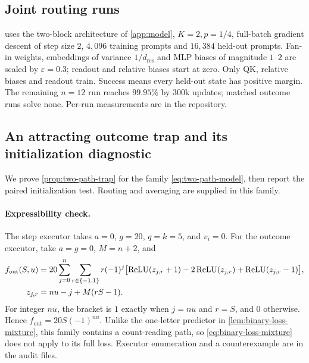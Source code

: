 \subsection{Joint routing runs}
\label{app:reach}

 uses the two-block architecture of \cref{app:model}, $K=2,p=1/4$,
full-batch gradient descent of step size $2$, $4{,}096$ training prompts and $16{,}384$
held-out prompts. Fan-in weights, embeddings of variance $1/d_{\mathrm{res}}$ and
MLP biases of magnitude $1$--$2$ are scaled by $\varepsilon=0.3$; readout and relative
biases start at zero. Only QK, relative biases and readout train. Success means every
held-out state has positive margin. The remaining $n=12$ run reaches $99.95\%$ by
$300$k updates; matched outcome runs solve none. Per-run measurements are in the repository.

\subsection{An attracting outcome trap and its initialization diagnostic}
\label{app:two-path}
We prove \cref{prop:two-path-trap} for the family \cref{eq:two-path-model}, then
report the paired initialization test. Routing and averaging are supplied in this family.

\paragraph{Expressibility check.}
The step executor takes $a=0$, $g=20$, $q=k=5$, and $v_i=0$.
For the outcome executor, take $a=g=0$, $M=n+2$, and
\[
\begin{aligned}
 f_{\mathrm{out}}(S,u)&=20\sum_{j=0}^n\sum_{r\in\{-1,1\}}r(-1)^j
 \bigl[\operatorname{ReLU}(z_{j,r}+1)-2\operatorname{ReLU}(z_{j,r})+\operatorname{ReLU}(z_{j,r}-1)\bigr],\\
 z_{j,r}&=nu-j+M(rS-1).
\end{aligned}
\]
For integer $nu$, the bracket is $1$ exactly when $j=nu$ and $r=S$, and
$0$ otherwise. Hence $f_{\mathrm{out}}=20S(-1)^{nu}$.
Unlike the one-letter predictor in \cref{lem:binary-loss-mixture}, this family
contains a count-reading path, so \cref{eq:binary-loss-mixture} does not apply to
its full loss. Executor enumeration and a counterexample are in the audit files.

